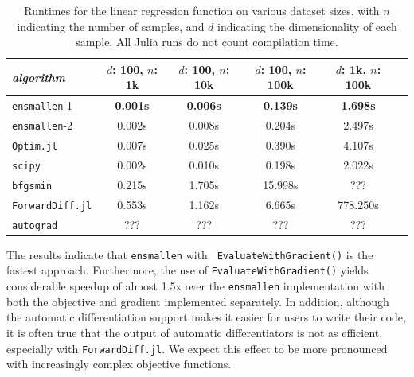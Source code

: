 \documentclass{article}
\begin{document}
\begin{table}
\centering
\begin{adjustbox}{scale={0.90}{0.90}}
\begin{tabular}{lccccc}
\toprule
{\em algorithm} & $d$: 100, $n$: 1k & $d$: 100, $n$: 10k & $d$: 100, $n$:
100k & $d$: 1k, $n$: 100k \\
\midrule
{\tt ensmallen}-1 & {\bf 0.001s} & {\bf 0.006s} & {\bf 0.139s} & {\bf 1.698s} \\
{\tt ensmallen}-2 & 0.002s & 0.008s & 0.204s & 2.497s \\
{\tt Optim.jl} & 0.007s & 0.025s & 0.390s & 4.107s \\
{\tt scipy} & 0.002s & 0.010s & 0.198s & 2.022s \\
{\tt bfgsmin} & 0.215s & 1.705s & 15.998s & ??? \\
{\tt ForwardDiff.jl} & 0.553s & 1.162s & 6.665s & 778.250s \\
{\tt autograd} & ??? & ??? & ??? & ??? \\
\bottomrule
\end{tabular}
\end{adjustbox}
\vspace*{0.25ex}
\caption{\footnotesize
Runtimes for the linear regression function on various dataset sizes,
with $n$ indicating the number of samples,
and $d$ indicating the dimensionality of each sample.
All Julia runs do not count compilation time.}
\label{tab:lbfgs}
\vspace*{-1ex}
\end{table}

The results indicate that \texttt{\small ensmallen} with \texttt{\small
EvaluateWithGradient()} is the fastest approach.
Furthermore, the use of \texttt{\small EvaluateWithGradient()} yields considerable
speedup of almost 1.5x over the \texttt{\small ensmallen} implementation with both the
objective and gradient implemented separately.  In addition, although the
automatic differentiation support makes it easier for users to write their
code, it is often true that the output of automatic differentiators is not as
efficient, especially with \texttt{\small ForwardDiff.jl}.  We expect this
effect to be more pronounced with increasingly complex objective functions.
\end{document}
